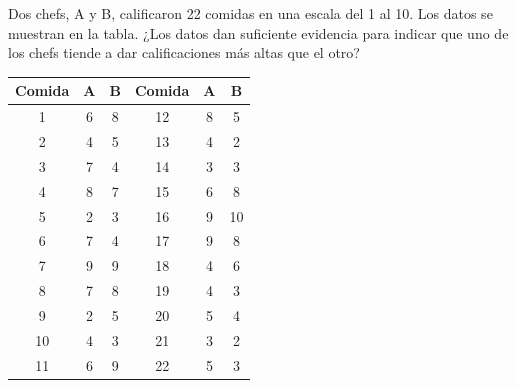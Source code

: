 \documentclass{article}
\begin{document}
Dos chefs, A y B, calificaron 22 comidas en una escala del 1 al 10. Los datos se muestran en la tabla. ¿Los datos dan suficiente evidencia para indicar que uno de los chefs tiende a dar calificaciones más altas que el otro?
\begin{center}
    \begin{tabular}{c c c| c c c}
        Comida & A & B & Comida & A & B  \\
        \hline
        1      & 6 & 8 & 12     & 8 & 5  \\
        2      & 4 & 5 & 13     & 4 & 2  \\
        3      & 7 & 4 & 14     & 3 & 3  \\
        4      & 8 & 7 & 15     & 6 & 8  \\
        5      & 2 & 3 & 16     & 9 & 10 \\
        6      & 7 & 4 & 17     & 9 & 8  \\
        7      & 9 & 9 & 18     & 4 & 6  \\
        8      & 7 & 8 & 19     & 4 & 3  \\
        9      & 2 & 5 & 20     & 5 & 4  \\
        10     & 4 & 3 & 21     & 3 & 2  \\
        11     & 6 & 9 & 22     & 5 & 3  \\
    \end{tabular}
\end{center}
\end{document}
